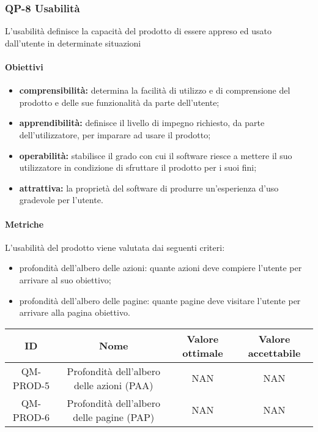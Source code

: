 \subsubsection{QP-8 Usabilità}
L'usabilità definisce la capacità del prodotto di essere appreso ed usato dall'utente in determinate situazioni
	\paragraph{Obiettivi}
		\begin{itemize}
			\item \textbf{comprensibilità:} determina la facilità di utilizzo e di comprensione del prodotto e delle sue funzionalità da parte dell'utente;
			\item \textbf{apprendibilità:} definisce il livello di impegno richiesto, da parte dell'utilizzatore, per imparare ad usare il prodotto;
			\item \textbf{operabilità:} stabilisce il grado con cui il software riesce a mettere il suo utilizzatore in condizione di sfruttare il prodotto per i suoi fini;
			\item \textbf{attrattiva:} la proprietà del software di produrre un'esperienza d'uso gradevole per l'utente.
		\end{itemize}
	\paragraph{Metriche}
	L'usabilità del prodotto viene valutata dai seguenti criteri:
	\begin{itemize}
		\item profondità dell'albero delle azioni: quante azioni deve compiere l'utente per arrivare al suo obiettivo;
		\item profondità dell'albero delle pagine: quante pagine deve visitare l'utente per arrivare alla pagina obiettivo.
	\end{itemize}
	\begin{center}
		\begin{tabular}{|c|c|c|c|}
			\hline
			ID & Nome & Valore ottimale & Valore accettabile \\
			\hline
			QM-PROD-5 & Profondità dell'albero delle azioni (PAA) & NAN & NAN \\
			\hline
			QM-PROD-6 & Profondità dell'albero delle pagine (PAP) & NAN & NAN \\
			\hline
		\end{tabular}
	\end{center}
